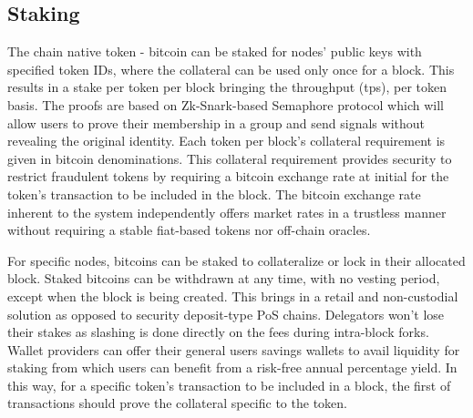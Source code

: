 \documentclass[a4paper, 10pt]{extarticle}
\begin{document}
\subsection{Staking}
The chain native token - bitcoin can be staked for nodes' public keys with specified token IDs, where the collateral can be used only once for a block. This results in a stake per token per block bringing the throughput (tps), per token basis. The proofs are based on Zk-Snark-based Semaphore protocol \cite{semaphore} which will allow users to prove their membership in a group and send signals without revealing the original identity. Each token per block's collateral requirement is given in bitcoin denominations. This collateral requirement provides security to restrict fraudulent tokens by requiring a bitcoin exchange rate at initial for the token's transaction to be included in the block. The bitcoin exchange rate inherent to the system independently offers market rates in a trustless manner without requiring a stable fiat-based tokens nor off-chain oracles. 

For specific nodes, bitcoins can be staked to collateralize or lock in their allocated block. Staked bitcoins can be withdrawn at any time, with no vesting period, except when the block is being created. This brings in a retail and non-custodial solution as opposed to security deposit-type PoS chains. Delegators won't lose their stakes as slashing is done directly on the fees during intra-block forks. Wallet providers can offer their general users savings wallets to avail liquidity for staking from which users can benefit from a risk-free annual percentage yield. In this way, for a specific token's transaction to be included in a block, the first of transactions should prove the collateral specific to the token.
\end{document}
